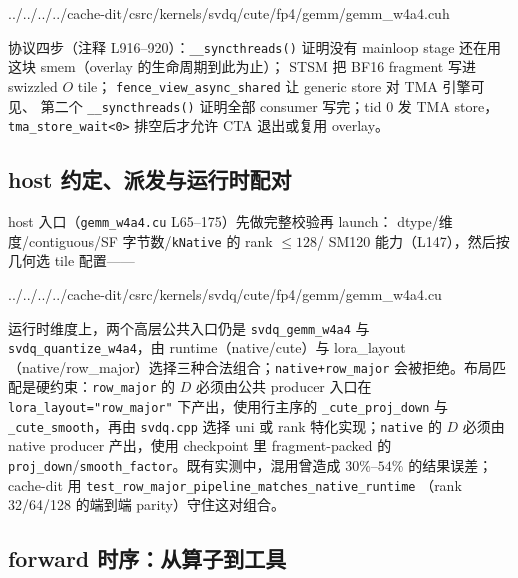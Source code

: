 \begin{lstinputlisting}[linerange={931-956},firstnumber=auto,
  title={gemm\_w4a4.cuh L931-956（单次 FP32$\to$BF16 + STSM + TMA store）}]{../../../../cache-dit/csrc/kernels/svdq/cute/fp4/gemm/gemm_w4a4.cuh}
\end{lstinputlisting}

协议四步（注释 L916--920）：\texttt{\_\_syncthreads()} 证明没有
mainloop stage 还在用这块 smem（overlay 的生命周期到此为止）；
STSM 把 BF16 fragment 写进 swizzled $O$ tile；
\texttt{fence\_view\_async\_shared} 让 generic store 对 TMA 引擎可见、
第二个 \texttt{\_\_syncthreads()} 证明全部 consumer 写完；tid 0 发
TMA store，\texttt{tma\_store\_wait<0>} 排空后才允许 CTA 退出或复用
overlay。

\subsection{host 约定、派发与运行时配对}

host 入口（\texttt{gemm\_w4a4.cu} L65--175）先做完整校验再 launch：
dtype/维度/contiguous/SF 字节数/\texttt{kNative} 的 rank $\le128$/
SM120 能力（L147），然后按几何选 tile 配置——

\begin{lstinputlisting}[linerange={156-173},firstnumber=auto,
  title={gemm\_w4a4.cu L156-173（两套 tile 配置的派发）}]{../../../../cache-dit/csrc/kernels/svdq/cute/fp4/gemm/gemm_w4a4.cu}
\end{lstinputlisting}

运行时维度上，两个高层公共入口仍是 \texttt{svdq\_gemm\_w4a4} 与
\texttt{svdq\_quantize\_w4a4}，由 runtime（native/cute）与
lora\_layout（native/row\_major）选择三种合法组合；\texttt{native+row\_major}
会被拒绝。布局匹配是硬约束：\texttt{row\_major} 的 $D$ 必须由公共 producer
入口在 \texttt{lora\_layout="row\_major"} 下产出，使用行主序的
\texttt{\_cute\_proj\_down} 与 \texttt{\_cute\_smooth}，再由 \texttt{svdq.cpp}
选择 uni 或 rank 特化实现；\texttt{native} 的 $D$ 必须由 native producer
产出，使用 checkpoint 里 fragment-packed 的
\texttt{proj\_down}/\texttt{smooth\_factor}。既有实测中，混用曾造成
$30\%$--$54\%$ 的结果误差；cache-dit 用
\texttt{test\_row\_major\_pipeline\_matches\_native\_runtime}
（rank 32/64/128 的端到端 parity）守住这对组合。

\subsection{forward 时序：从算子到工具}

